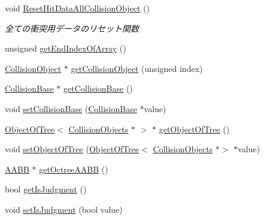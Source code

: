 \begin{DoxyCompactItemize}
void \mbox{\hyperlink{class_collision_objects_a01ffe9567540a819f19cd66f96981b47}{Reset\+Hit\+Data\+All\+Collision\+Object}} ()
\begin{DoxyCompactList}\small\item\em 全ての衝突用データのリセット関数 \end{DoxyCompactList}\item 
unsigned \mbox{\hyperlink{class_collision_objects_a309eef4695b4a19f389eaf5d0753c256}{get\+End\+Index\+Of\+Array}} ()
\item 
\mbox{\hyperlink{class_collision_object}{Collision\+Object}} $\ast$ \mbox{\hyperlink{class_collision_objects_a4f5c029b20a7ed4c7fdee815f73d20be}{get\+Collision\+Object}} (unsigned index)
\item 
\mbox{\hyperlink{class_collision_base}{Collision\+Base}} $\ast$ \mbox{\hyperlink{class_collision_objects_af95769194fff92babcf411c2262c9d10}{get\+Collision\+Base}} ()
\item 
void \mbox{\hyperlink{class_collision_objects_a144f0c9160c0dda1579c26a0726fdbb6}{set\+Collision\+Base}} (\mbox{\hyperlink{class_collision_base}{Collision\+Base}} $\ast$value)
\item 
\mbox{\hyperlink{class_object_of_tree}{Object\+Of\+Tree}}$<$ \mbox{\hyperlink{class_collision_objects}{Collision\+Objects}} $\ast$ $>$ $\ast$ \mbox{\hyperlink{class_collision_objects_a344311b0c469e591a112eb1d6b0247cb}{get\+Object\+Of\+Tree}} ()
\item 
void \mbox{\hyperlink{class_collision_objects_a3d5a69741d66dcdebfae5a54a15c4b88}{set\+Object\+Of\+Tree}} (\mbox{\hyperlink{class_object_of_tree}{Object\+Of\+Tree}}$<$ \mbox{\hyperlink{class_collision_objects}{Collision\+Objects}} $\ast$$>$ $\ast$value)
\item 
\mbox{\hyperlink{class_a_a_b_b}{A\+A\+BB}} $\ast$ \mbox{\hyperlink{class_collision_objects_aee138e1c28f7f3dcbdce56181d59b628}{get\+Octree\+A\+A\+BB}} ()
\item 
bool \mbox{\hyperlink{class_collision_objects_a1320a57aae5798c04e65b2b7c8433aae}{get\+Is\+Judgment}} ()
\item 
void \mbox{\hyperlink{class_collision_objects_a61e67c1c0ea20a01d9e4a5b2d1b45428}{set\+Is\+Judgment}} (bool value)
\end{DoxyCompactItemize}
